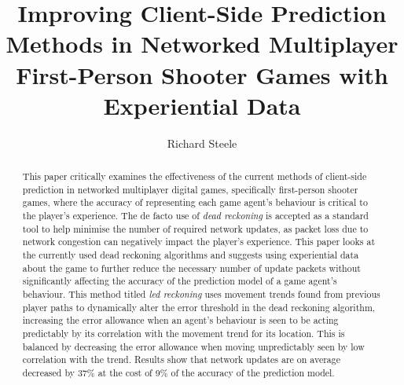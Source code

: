 \documentclass[journal]{IEEEtran}
\begin{document}
%
\title{Improving Client-Side Prediction Methods in Networked Multiplayer First-Person Shooter Games with Experiential Data}
%
%
\author{Richard Steele}


\maketitle

\begin{abstract}
This paper critically examines the effectiveness of the current methods of client-side prediction in networked multiplayer digital games, specifically first-person shooter games, where the accuracy of representing each game agent's behaviour is critical to the player's experience. The de facto use of \textit{dead reckoning} is accepted as a standard tool to help minimise the number of required network updates, as packet loss due to network congestion can negatively impact the player's experience. This paper looks at the currently used dead reckoning algorithms and suggests using experiential data about the game to further reduce the necessary number of update packets without significantly affecting the accuracy of the prediction model of a game agent's behaviour. This method titled \textit{led reckoning} uses movement trends found from previous player paths to dynamically alter the error threshold in the dead reckoning algorithm, increasing the error allowance when an agent's behaviour is seen to be acting predictably by its correlation with the movement trend for its location. This is balanced by decreasing the error allowance when moving unpredictably seen by low correlation with the trend. Results show that network updates are on average decreased by 37\% at the cost of 9\% of the accuracy of the prediction model.
\end{abstract}
\end{document}
